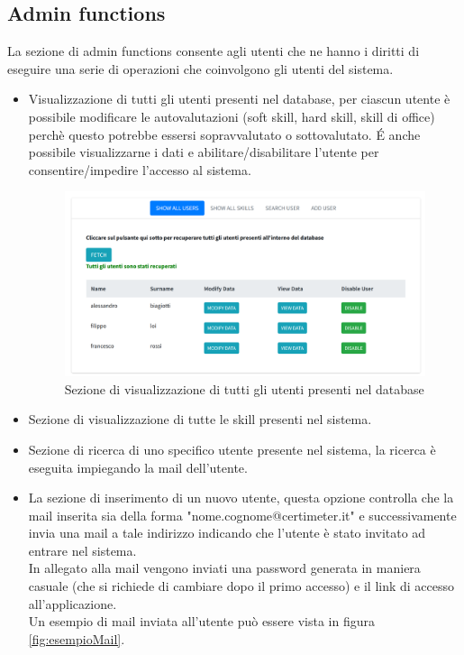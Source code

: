 \subsection{Admin functions}
La sezione di admin functions consente agli utenti che ne hanno i diritti di eseguire una serie di operazioni che coinvolgono gli utenti del sistema.
\begin{itemize}
    \item Visualizzazione di tutti gli utenti presenti nel database, per ciascun utente è possibile modificare le autovalutazioni (soft skill, hard skill, skill di office) perchè questo potrebbe essersi sopravvalutato o sottovalutato. \'E anche possibile visualizzarne i dati e abilitare/disabilitare l'utente per consentire/impedire l'accesso al sistema.
    \begin{figure}[h]
        \centering
        \includegraphics[width=450px]{./images/show_all_users.png}
        \caption{Sezione di visualizzazione di tutti gli utenti presenti nel database}
    \end{figure}
    \item Sezione di visualizzazione di tutte le skill presenti nel sistema.
    \item Sezione di ricerca di uno specifico utente presente nel sistema, la ricerca è eseguita impiegando la mail dell'utente.
    \item La sezione di inserimento di un nuovo utente, questa opzione controlla che la mail inserita sia della forma "nome.cognome@certimeter.it" e successivamente invia una mail a tale indirizzo indicando che l'utente è stato invitato ad entrare nel sistema.
    \\
    In allegato alla mail vengono inviati una password generata in maniera casuale (che si richiede di cambiare dopo il primo accesso) e il link di accesso all'applicazione.
    \\
    Un esempio di mail inviata all'utente può essere vista in figura \ref{fig:esempioMail}.

\end{itemize}
